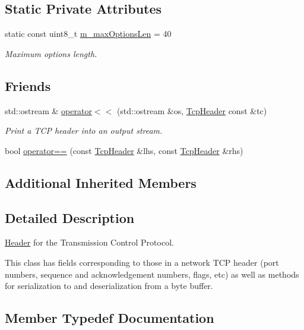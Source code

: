 \subsection*{Static Private Attributes}
\begin{DoxyCompactItemize}
\item 
static const uint8\+\_\+t \hyperlink{classns3_1_1TcpHeader_a58c3a4deba26f4c3bce21915bcef09ea}{m\+\_\+max\+Options\+Len} = 40
\begin{DoxyCompactList}\small\item\em Maximum options length. \end{DoxyCompactList}\end{DoxyCompactItemize}
\subsection*{Friends}
\begin{DoxyCompactItemize}
\item 
std\+::ostream \& \hyperlink{classns3_1_1TcpHeader_a9337c7da58c82e2e3aec5b762842f369}{operator$<$$<$} (std\+::ostream \&os, \hyperlink{classns3_1_1TcpHeader}{Tcp\+Header} const \&tc)
\begin{DoxyCompactList}\small\item\em Print a T\+CP header into an output stream. \end{DoxyCompactList}\item 
bool \hyperlink{classns3_1_1TcpHeader_a38e3df5b51140ffcf529437c2f373770}{operator==} (const \hyperlink{classns3_1_1TcpHeader}{Tcp\+Header} \&lhs, const \hyperlink{classns3_1_1TcpHeader}{Tcp\+Header} \&rhs)
\end{DoxyCompactItemize}
\subsection*{Additional Inherited Members}


\subsection{Detailed Description}
\hyperlink{classns3_1_1Header}{Header} for the Transmission Control Protocol. 

This class has fields corresponding to those in a network T\+CP header (port numbers, sequence and acknowledgement numbers, flags, etc) as well as methods for serialization to and deserialization from a byte buffer. 

\subsection{Member Typedef Documentation}
